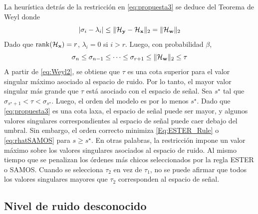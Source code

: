 La heurística detrás de la restricción en \eqref{eq:propuesta3} se deduce del Teorema de Weyl \cite{Horn1991} donde 
\begin{equation}
	|\sigma_i - \lambda_i|\le \|\mathcal{H}_{\mathbf{y}} - \mathcal{H}_{\mathbf{x}}\|_2 = \|\mathcal{H}_{\mathbf{w}}\|_2
	\label{eq:Weyl}
\end{equation}
Dado que $\mathrm{rank}(\mathcal{H}_{\mathbf{x}}) = r$,  $\lambda_{i} = 0$ si $i > r$. Luego, con probabilidad $\beta$, 
\begin{equation}
	\sigma_n \le \sigma_{n-1}\le \cdots \le \sigma_{r+1} \le \|\mathcal{H}_{\mathbf{w}}\|_2\le \tau
	\label{eq:Weyl2}
\end{equation} 
A partir de \eqref{eq:Weyl2}, se obtiene que $\tau$ es una cota superior para el valor singular máximo asociado al espacio de ruido. Por lo tanto, el mayor valor singular más grande que $\tau$ está asociado con el espacio de señal. Sea $s^\star$ tal que $\sigma_{s^\star+1}<\tau<\sigma_{s^\star}$. Luego, el orden del modelo es por lo menos $s^\star$. Dado que \eqref{eq:propuesta3} es una cota laxa, el espacio de señal puede ser mayor, y algunos valores singulares correspondientes al espacio de señal puede caer debajo del umbral. Sin embargo, el orden correcto minimiza  \eqref{Eq:ESTER_Rule} o \eqref{eq:rhatSAMOS} para $s\ge s^\star$. En otras palabras, la restricción impone un valor máximo sobre los valores singulares asociados al espacio de ruido. Al mismo tiempo que se penalizan los órdenes más chicos seleccionados por la regla ESTER o SAMOS. Cuando se selecciona $\tau_2$ en vez de $\tau_1$, no se puede afirmar que todos los valores singulares mayores que $\tau_2$ corresponden al espacio de señal.

\subsection{Nivel de ruido desconocido}

